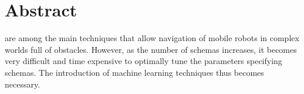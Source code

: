 \documentclass[journal]{IEEEtran}
\begin{document}







\maketitle


%






%
\IEEEpeerreviewmaketitle

\section*{Abstract}
 are among the main techniques that allow navigation
of mobile robots in complex worlds full of obstacles. However,
as the number of schemas increases, it becomes very
difficult and time expensive to optimally tune the parameters specifying
schemas. The introduction of machine learning techniques thus becomes necessary.
\end{document}
